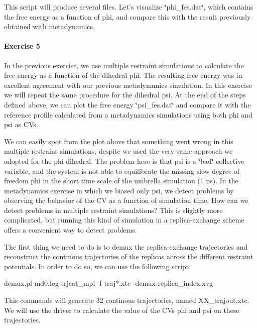 This script will produce several files. Let's visualize \char`\"{}phi\+\_\+fes.\+dat\char`\"{}, which contains the free energy as a function of phi, and compare this with the result previously obtained with metadynamics.

\label{munster_munster-usrem-phi-fes}%
\hypertarget{munster_munster-usrem-phi-fes}{}%
\hypertarget{munster_munster-exercise-5}{}\paragraph{Exercise 5}\label{munster_munster-exercise-5}
In the previous exercise, we use multiple restraint simulations to calculate the free energy as a function of the dihedral phi. The resulting free energy was in excellent agreement with our previous metadynamics simulation. In this exercise we will repeat the same procedure for the dihedral psi. At the end of the steps defined above, we can plot the free energy \char`\"{}psi\+\_\+fes.\+dat\char`\"{} and compare it with the reference profile calculated from a metadynamics simulations using both phi and psi as C\+Vs.

\label{munster_munster-usrem-psi-fes}%
\hypertarget{munster_munster-usrem-psi-fes}{}%
 We can easily spot from the plot above that something went wrong in this multiple restraint simulations, despite we used the very same approach we adopted for the phi dihedral. The problem here is that psi is a \char`\"{}bad\char`\"{} collective variable, and the system is not able to equilibrate the missing slow degree of freedom phi in the short time scale of the umbrella simulation (1 ns). In the metadynamics exercise in which we biased only psi, we detect problems by observing the behavior of the C\+V as a function of simulation time. How can we detect problems in multiple restraint simulations? This is slightly more complicated, but running this kind of simulation in a replica-\/exchange scheme offers a convenient way to detect problems.

The first thing we need to do is to demux the replica-\/exchange trajectories and reconstruct the continous trajectories of the replicas across the different restraint potentials. In order to do so, we can use the following script\+:

\begin{DoxyVerb}demux.pl md0.log
trjcat_mpi -f traj*.xtc  -demux replica_index.xvg
\end{DoxyVerb}


This commands will generate 32 continous trajectories, named X\+X\+\_\+trajout.\+xtc. We will use the driver to calculate the value of the C\+Vs phi and psi on these trajectories.

